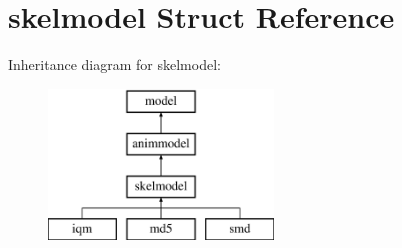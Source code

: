 \hypertarget{structskelmodel}{}\section{skelmodel Struct Reference}
\label{structskelmodel}
Inheritance diagram for skelmodel\+:\begin{figure}[H]
\begin{center}
\leavevmode
\includegraphics[height=4.000000cm]{structskelmodel}
\end{center}
\end{figure}
